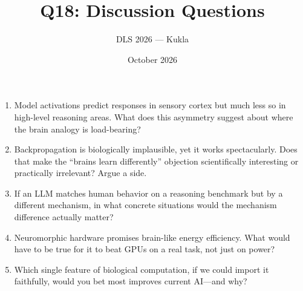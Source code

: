 \documentclass[11pt]{article}
\title{Q18: Discussion Questions}
\author{DLS 2026 --- Kukla}
\date{October 2026}
\begin{document}
\maketitle
\begin{enumerate}[leftmargin=1.5em]
\item Model activations predict responses in sensory cortex but much less so in high-level reasoning areas. What does this asymmetry suggest about where the brain analogy is load-bearing?
\item Backpropagation is biologically implausible, yet it works spectacularly. Does that make the ``brains learn differently'' objection scientifically interesting or practically irrelevant? Argue a side.
\item If an LLM matches human behavior on a reasoning benchmark but by a different mechanism, in what concrete situations would the mechanism difference actually matter?
\item Neuromorphic hardware promises brain-like energy efficiency. What would have to be true for it to beat GPUs on a real task, not just on power?
\item Which single feature of biological computation, if we could import it faithfully, would you bet most improves current AI---and why?
\end{enumerate}
\end{document}
